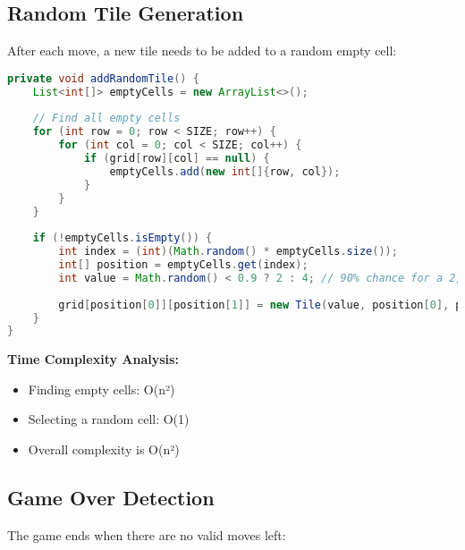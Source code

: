 \documentclass[12pt, a4paper]{article}
\begin{document}
\subsection{Random Tile Generation}
After each move, a new tile needs to be added to a random empty cell:

\begin{lstlisting}[language=Java, caption=Random Tile Generation]
private void addRandomTile() {
    List<int[]> emptyCells = new ArrayList<>();
    
    // Find all empty cells
    for (int row = 0; row < SIZE; row++) {
        for (int col = 0; col < SIZE; col++) {
            if (grid[row][col] == null) {
                emptyCells.add(new int[]{row, col});
            }
        }
    }
    
    if (!emptyCells.isEmpty()) {
        int index = (int)(Math.random() * emptyCells.size());
        int[] position = emptyCells.get(index);
        int value = Math.random() < 0.9 ? 2 : 4; // 90% chance for a 2, 10% for a 4
        
        grid[position[0]][position[1]] = new Tile(value, position[0], position[1]);
    }
}
\end{lstlisting}

\textbf{Time Complexity Analysis:}
\begin{itemize}
    \item Finding empty cells: O(n²)
    \item Selecting a random cell: O(1)
    \item Overall complexity is O(n²)
\end{itemize}

\subsection{Game Over Detection}
The game ends when there are no valid moves left:
\end{document}
